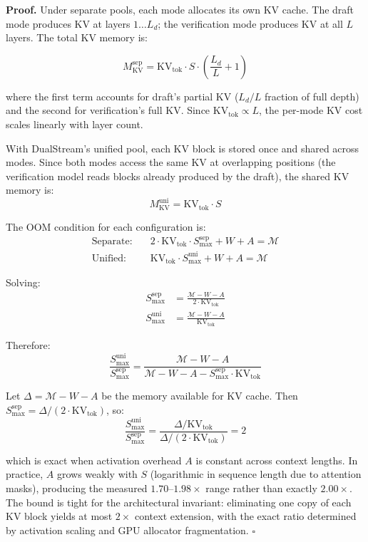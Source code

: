 \documentclass[review]{elsarticle}
\theoremstyle{definition}
\theoremstyle{remark}
\renewenvironment{proof}{\noindent\textbf{Proof.}}{\hfill$\square$\par}
\begin{document}
\begin{proof}
Under separate pools, each mode allocates its own KV cache. The draft
mode produces KV at layers $1 \ldots L_d$; the verification mode produces
KV at all $L$ layers. The total KV memory is:

\[
M_{\text{KV}}^{\text{sep}} = \text{KV}_{\text{tok}} \cdot S \cdot
    \left(\frac{L_d}{L} + 1\right)
\]

where the first term accounts for draft's partial KV ($L_d/L$ fraction of
full depth) and the second for verification's full KV. Since
$\text{KV}_{\text{tok}} \propto L$, the per-mode KV cost scales linearly
with layer count.

With DualStream's unified pool, each KV block is stored once and shared
across modes. Since both modes access the same KV at overlapping positions
(the verification model reads blocks already produced by the draft), the
shared KV memory is:
\[
M_{\text{KV}}^{\text{uni}} = \text{KV}_{\text{tok}} \cdot S
\]

The OOM condition for each configuration is:
\begin{align*}
\text{Separate:}&\quad 2 \cdot \text{KV}_{\text{tok}} \cdot S_{\max}^{\text{sep}} + W + A = \mathcal{M} \\
\text{Unified:}&\quad \text{KV}_{\text{tok}} \cdot S_{\max}^{\text{uni}} + W + A = \mathcal{M}
\end{align*}

Solving:
\begin{align*}
S_{\max}^{\text{sep}} &= \frac{\mathcal{M} - W - A}{2 \cdot \text{KV}_{\text{tok}}} \\
S_{\max}^{\text{uni}} &= \frac{\mathcal{M} - W - A}{\text{KV}_{\text{tok}}}
\end{align*}

Therefore:
\[
\frac{S_{\max}^{\text{uni}}}{S_{\max}^{\text{sep}}}
    = \frac{\mathcal{M} - W - A}{\mathcal{M} - W - A - S_{\max}^{\text{sep}}
    \cdot \text{KV}_{\text{tok}}}
\]

Let $\Delta = \mathcal{M} - W - A$ be the memory available for KV cache.
Then $S_{\max}^{\text{sep}} = \Delta / (2 \cdot \text{KV}_{\text{tok}})$,
so:
\[
\frac{S_{\max}^{\text{uni}}}{S_{\max}^{\text{sep}}}
    = \frac{\Delta / \text{KV}_{\text{tok}}}
           {\Delta / (2 \cdot \text{KV}_{\text{tok}})}
    = 2
\]

which is exact when activation overhead $A$ is constant across
context lengths. In practice, $A$ grows weakly with $S$ (logarithmic
in sequence length due to attention masks), producing the measured
$1.70$--$1.98\times$ range rather than exactly $2.00\times$. The bound
is tight for the architectural invariant: eliminating one copy of each
KV block yields at most $2\times$ context extension, with the exact
ratio determined by activation scaling and GPU allocator fragmentation.
\end{proof}
\end{document}
